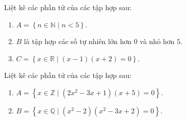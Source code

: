 \begin{vd}%
Liệt kê các phần tử của các tập hợp sau:
\begin{enumerate}
\item $A=\left\lbrace n\in \mathbb{N} \mid n<5\right\rbrace$.
\item $B$ là tập hợp các số tự nhiên lớn hơn $0$ và nhỏ hơn $5$.
\item $C=\left\lbrace x\in \mathbb{R}\mid (x-1)(x+2)=0\right\rbrace$.
\end{enumerate}
\end{vd}
\begin{vd}%
Liệt kê các phần tử của các tập hợp sau:
\begin{enumerate}
\item $A=\left\lbrace x\in\mathbb{Z}\mid (2x^2-3x+1)(x+5)=0\right\rbrace$.
\item $B=\left\lbrace x\in \mathbb{Q}\mid (x^2-2)(x^2-3x+2)=0\right\rbrace$.
\end{enumerate}
\end{vd}
